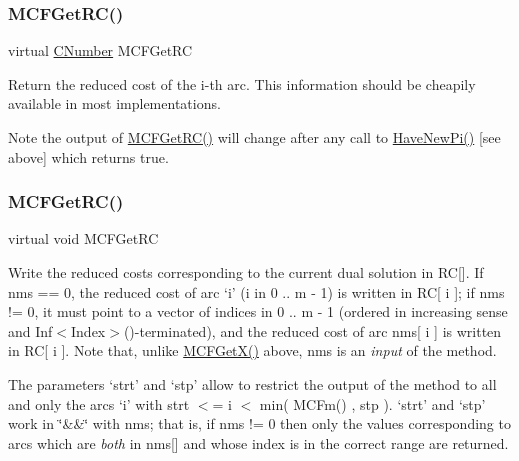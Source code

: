 \mbox{\label{class_s_p_tree_a7c103b582c910ccfda354032aae5722e}} 
\subsubsection{\texorpdfstring{M\+C\+F\+Get\+R\+C()}{MCFGetRC()}\hspace{0.1cm}{\footnotesize\ttfamily [1/5]}}
{\footnotesize\ttfamily virtual \mbox{\hyperlink{class_m_c_f_class_a24d0627ba8213afe1ec4ebeb4508e8f1}{C\+Number}} M\+C\+F\+Get\+RC}

Return the reduced cost of the i-\/th arc. This information should be cheapily available in most implementations.

\begin{DoxyNote}{Note}
the output of \mbox{\hyperlink{class_m_c_f_class_af027cee8179a876a4879c73820c380d1}{M\+C\+F\+Get\+R\+C()}} will change after any call to \mbox{\hyperlink{class_m_c_f_class_a87b2b6516a7874ac55145312bd2d55bb}{Have\+New\+Pi()}} \mbox{[}see above\mbox{]} which returns true. 
\end{DoxyNote}
\mbox{\label{class_s_p_tree_a361d84ae42041fdbf3824d45fc4c54aa}} 
\subsubsection{\texorpdfstring{M\+C\+F\+Get\+R\+C()}{MCFGetRC()}\hspace{0.1cm}{\footnotesize\ttfamily [2/5]}}
{\footnotesize\ttfamily virtual void M\+C\+F\+Get\+RC}

Write the reduced costs corresponding to the current dual solution in RC\mbox{[}\mbox{]}. If nms == 0, the reduced cost of arc `i' (i in 0 .. m -\/ 1) is written in RC\mbox{[} i \mbox{]}; if nms != 0, it must point to a vector of indices in 0 .. m -\/ 1 (ordered in increasing sense and Inf$<$\+Index$>$()-\/terminated), and the reduced cost of arc nms\mbox{[} i \mbox{]} is written in RC\mbox{[} i \mbox{]}. Note that, unlike \mbox{\hyperlink{class_m_c_f_class_a4eb307e0707adaef99bb0e08c9e10eb8}{M\+C\+F\+Get\+X()}} above, nms is an {\itshape input} of the method.

The parameters `strt' and `stp' allow to restrict the output of the method to all and only the arcs `i' with strt $<$= i $<$ min( M\+C\+Fm() , stp ). `strt' and `stp' work in \char`\"{}\&\&\char`\"{} with nms; that is, if nms != 0 then only the values corresponding to arcs which are {\itshape both} in nms\mbox{[}\mbox{]} and whose index is in the correct range are returned.

